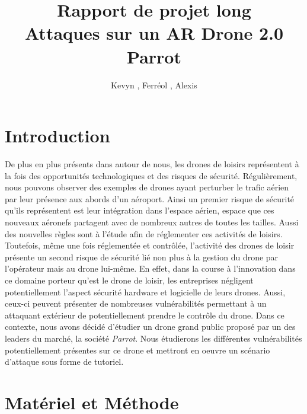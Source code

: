 \documentclass[a4paper,12pt]{report}
\title{Rapport de projet long \\ Attaques sur un AR Drone 2.0 Parrot}
\author{Kevyn \bsc{Ledieu}, Ferréol \bsc{Pennel}, Alexis \bsc{Pernot}}
\begin{document}
\maketitle
\tableofcontents
\newpage

\section{Introduction}
De plus en plus présents dans autour de nous, les drones de loisirs représentent à la fois des opportunités technologiques et des risques de sécurité. Régulièrement, nous pouvons observer des exemples de drones ayant perturber le trafic aérien par leur présence aux abords d'un aéroport. Ainsi un premier risque de sécurité qu'ils représentent est leur intégration dans l'espace aérien, espace que ces nouveaux aéronefs partagent avec de nombreux autres de toutes les tailles. Aussi des nouvelles règles sont à l'étude afin de réglementer ces activités de loisirs. Toutefois, même une fois réglementée et contrôlée, l'activité des drones de loisir présente un second risque de sécurité lié non plus à la gestion du drone par l'opérateur mais au drone lui-même. En effet, dans la course à l'innovation dans ce domaine porteur qu'est le drone de loisir, les entreprises négligent potentiellement l'aspect sécurité hardware et logicielle de leurs drones. Aussi, ceux-ci peuvent présenter de nombreuses vulnérabilités permettant à un attaquant extérieur de potentiellement prendre le contrôle du drone. Dans ce contexte, nous avons décidé d'étudier un drone grand public proposé par un des leaders du marché, la société \textit{Parrot}. Nous étudierons les différentes vulnérabilités potentiellement présentes sur ce drone et mettront en oeuvre un scénario d'attaque sous forme de tutoriel.

\section{Matériel et Méthode}
\end{document}
